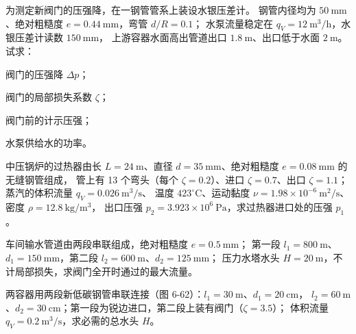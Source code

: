 \begin{ti}
\item[\textbf{6-23}] 为测定新阀门的压强降，在一钢管管系上装设水银压差计。
钢管内径均为 $50\ \mathrm{mm}$、绝对粗糙度 $e=0.44\ \mathrm{mm}$，弯管 $d/R=0.1$；
水泵流量稳定在 $q_V=12\ \mathrm{m^3/h}$，水银压差计读数 $150\ \mathrm{mm}$，
上游容器水面高出管道出口 $1.8\ \mathrm{m}$、出口低于水面 $2\ \mathrm{m}$。试求：
\begin{xiaowen}
\item 阀门的压强降 $\Delta p$；
\item 阀门的局部损失系数 $\zeta$；
\item 阀门前的计示压强；
\item 水泵供给水的功率。
\end{xiaowen}
\quad{}\quad{}

\item[\textbf{6-24}] 中压锅炉的过热器由长 $L=24\ \mathrm{m}$、直径 $d=35\ \mathrm{mm}$、绝对粗糙度 $e=0.08\ \mathrm{mm}$ 的无缝钢管组成，
管上有 13 个弯头（每个 $\zeta=0.2$）、进口 $\zeta=0.7$、出口 $\zeta=1.1$；蒸汽的体积流量 $q_V=0.026\ \mathrm{m^3/s}$、
温度 $423^\circ\mathrm{C}$、运动黏度 $\nu=1.98\times10^{-6}\ \mathrm{m^2/s}$、密度 $\rho=12.8\ \mathrm{kg/m^3}$，
出口压强 $p_2=3.923\times10^6\ \mathrm{Pa}$，求过热器进口处的压强 $p_1$。
\quad{}\quad{}

\item[\textbf{6-25}] 车间输水管道由两段串联组成，绝对粗糙度 $e=0.5\ \mathrm{mm}$；
第一段 $l_1=800\ \mathrm{m}$、$d_1=150\ \mathrm{mm}$，第二段 $l_2=600\ \mathrm{m}$、$d_2=125\ \mathrm{mm}$；
压力水塔水头 $H=20\ \mathrm{m}$，不计局部损失，求阀门全开时通过的最大流量。
\quad{}\quad{}

\item[\textbf{6-26}] 两容器用两段新低碳钢管串联连接（图 6-62）：$l_1=30\ \mathrm{m}$、$d_1=20\ \mathrm{cm}$，
$l_2=60\ \mathrm{m}$、$d_2=30\ \mathrm{cm}$；第一段为锐边进口，第二段上装有阀门（$\zeta=3.5$）；
体积流量 $q_V=0.2\ \mathrm{m^3/s}$，求必需的总水头 $H$。
\quad{}\quad{}


\end{ti}
